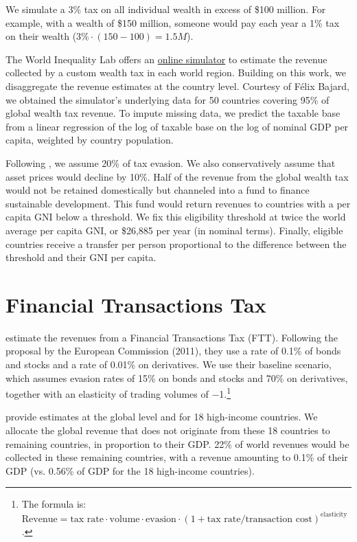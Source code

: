 \documentclass[12pt,english]{article}
\begin{document}
We simulate a 3\% tax on all individual wealth in excess of \$100 million. For example, with a wealth of \$150 million, someone would pay each year a 1\% tax on their wealth ($3\% \cdot \left(150-100\right)=1.5M$). 


The World Inequality Lab offers an \href{https://wid.world/world-wealth-tax-simulator/}{online simulator} to estimate the revenue collected by a custom wealth tax in each world region. Building on this work, we disaggregate the revenue estimates at the country level. Courtesy of Félix Bajard, we obtained the simulator's underlying data for 50 countries covering 95\% of global wealth tax revenue. To impute missing data, we predict the taxable base from a linear regression of the log of taxable base on the log of nominal GDP per capita, weighted by country population. 

Following \cite{zucman_blueprint_2024}, we assume 20\% of tax evasion. We also conservatively assume that asset prices would decline by 10\%. Half of the revenue from the global wealth tax would not be retained domestically but channeled into a fund to finance sustainable development. This fund would return revenues to countries with a per capita GNI below a threshold. We fix this eligibility threshold at twice the world average per capita GNI, or \$26,885 per year (in nominal terms). Finally, eligible countries receive a transfer per person %
proportional to the difference between the threshold and their GNI per capita.


\section{Financial Transactions Tax}\label{sec:ftt}

\cite{pekanov_global_2019} estimate the revenues from a Financial Transactions Tax (FTT). Following the proposal by the European Commission (2011), they use a rate of 0.1\% of bonds and stocks and a rate of 0.01\% on derivatives. We use their baseline scenario, which assumes evasion rates of 15\% on bonds and stocks and 70\% on derivatives, together with an elasticity of trading volumes of $-$1.\footnote{The formula is: $\text{Revenue} = \text{tax rate} \cdot \text{volume} \cdot \text{evasion} \cdot \left(1 + \text{tax rate} / \text{transaction cost}\right)^\text{elasticity}$.} 

\cite{pekanov_global_2019} provide estimates at the global level and for 18 high-income countries. We allocate the global revenue that does not originate from these 18 countries to remaining countries, in proportion to their GDP. 22\% of world revenues would be collected in these remaining countries, with a revenue amounting to 0.1\% of their GDP (vs. 0.56\% of GDP for the 18 high-income countries).
\end{document}
